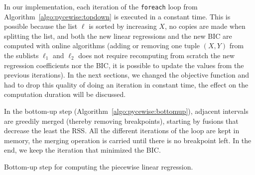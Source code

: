                 In our implementation, each iteration of the \texttt{foreach} loop from
                Algorithm~\ref{algo:pycewise:topdown} is executed in a constant time. This is possible because the list
                \(\ell\) is sorted by increasing \(X\), no copies are made when splitting the list, and both the new linear
                regressions and the new BIC are computed with online algorithms (\ie adding or removing one tuple
                \((X,Y)\) from the sublists \(\ell_1\) and \(\ell_2\) does not require recomputing from scratch the new
                regression coefficients nor the BIC, it is possible to update the values from the previous iterations).
                In the next sections, we changed the objective function and had to drop this quality of doing an
                iteration in constant time, the effect on the computation duration will be discussed.

                In the bottom-up step (Algorithm~\ref{algo:pycewise:bottomup}), adjacent intervals are greedily merged
                (thereby removing breakpoints), starting by fusions that decrease the least the RSS. All the different
                iterations of the loop are kept in memory, the merging operation is carried until there is no breakpoint
                left. In the end, we keep the iteration that minimized the BIC.
                \begin{algorithm}
                    \DontPrintSemicolon
                    \caption{Bottom-up step for computing the piecewise linear regression.}
                    \label{algo:pycewise:bottomup}
                \end{algorithm}


